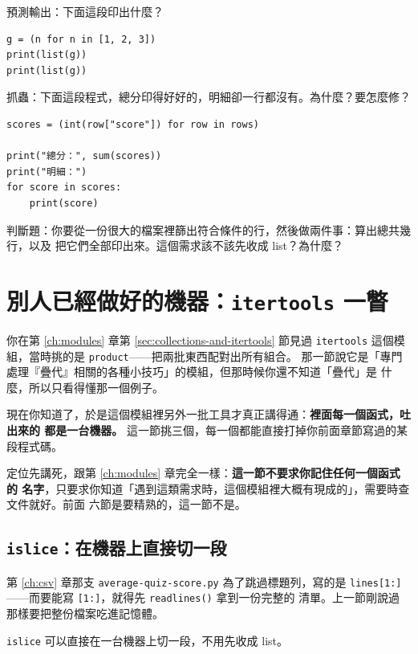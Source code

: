 \begin{drills}[label=drills:one-shot]
\item 預測輸出：下面這段印出什麼？
\begin{verbatim}
g = (n for n in [1, 2, 3])
print(list(g))
print(list(g))
\end{verbatim}
\item 抓蟲：下面這段程式，總分印得好好的，明細卻一行都沒有。為什麼？要怎麼修？
\begin{verbatim}
scores = (int(row["score"]) for row in rows)

print("總分：", sum(scores))
print("明細：")
for score in scores:
    print(score)
\end{verbatim}
\item 判斷題：你要從一份很大的檔案裡篩出符合條件的行，然後做兩件事：算出總共幾行，以及
把它們全部印出來。這個需求該不該先收成 list？為什麼？
\end{drills}

\section{別人已經做好的機器：\texttt{itertools} 一瞥}
\label{sec:itertools-peek}

你在第 \ref{ch:modules} 章第 \ref{sec:collections-and-itertools} 節見過
\texttt{itertools} 這個模組，當時挑的是 \texttt{product}——把兩批東西配對出所有組合。
那一節說它是「專門處理『疊代』相關的各種小技巧」的模組，但那時候你還不知道「疊代」是
什麼，所以只看得懂那一個例子。

現在你知道了，於是這個模組裡另外一批工具才真正講得通：\textbf{裡面每一個函式，吐出來的
都是一台機器。} 這一節挑三個，每一個都能直接打掉你前面章節寫過的某段程式碼。

定位先講死，跟第 \ref{ch:modules} 章完全一樣：\textbf{這一節不要求你記住任何一個函式的
名字}，只要求你知道「遇到這類需求時，這個模組裡大概有現成的」，需要時查文件就好。前面
六節是要精熟的，這一節不是。

\subsection*{\texttt{islice}：在機器上直接切一段}

第 \ref{ch:csv} 章那支 \texttt{average-quiz-score.py} 為了跳過標題列，寫的是
\texttt{lines[1:]}——而要能寫 \texttt{[1:]}，就得先 \texttt{readlines()} 拿到一份完整的
清單。上一節剛說過那樣要把整份檔案吃進記憶體。

\texttt{islice} 可以直接在一台機器上切一段，不用先收成 list。

